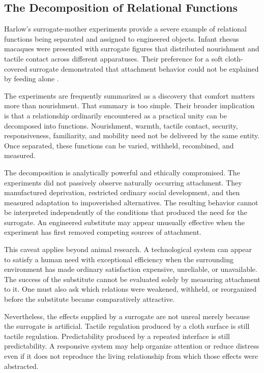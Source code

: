 \documentclass[11pt]{article}
\begin{document}
\subsection{The Decomposition of Relational Functions}

Harlow's surrogate-mother experiments provide a severe example of relational
functions being separated and assigned to engineered objects. Infant rhesus
macaques were presented with surrogate figures that distributed nourishment
and tactile contact across different apparatuses. Their preference for a soft
cloth-covered surrogate demonstrated that attachment behavior could not be
explained by feeding alone \citep{harlow1958}.

The experiments are frequently summarized as a discovery that comfort matters
more than nourishment. That summary is too simple. Their broader implication
is that a relationship ordinarily encountered as a practical unity can be
decomposed into functions. Nourishment, warmth, tactile contact, security,
responsiveness, familiarity, and mobility need not be delivered by the same
entity. Once separated, these functions can be varied, withheld, recombined,
and measured.

The decomposition is analytically powerful and ethically compromised. The
experiments did not passively observe naturally occurring attachment. They
manufactured deprivation, restricted ordinary social development, and then
measured adaptation to impoverished alternatives. The resulting behavior
cannot be interpreted independently of the conditions that produced the need
for the surrogate. An engineered substitute may appear unusually effective
when the experiment has first removed competing sources of attachment.

This caveat applies beyond animal research. A technological system can appear
to satisfy a human need with exceptional efficiency when the surrounding
environment has made ordinary satisfaction expensive, unreliable, or
unavailable. The success of the substitute cannot be evaluated solely by
measuring attachment to it. One must also ask which relations were weakened,
withheld, or reorganized before the substitute became comparatively
attractive.

Nevertheless, the effects supplied by a surrogate are not unreal merely
because the surrogate is artificial. Tactile regulation produced by a cloth
surface is still tactile regulation. Predictability produced by a repeated
interface is still predictability. A responsive system may help organize
attention or reduce distress even if it does not reproduce the living
relationship from which those effects were abstracted.
\end{document}
